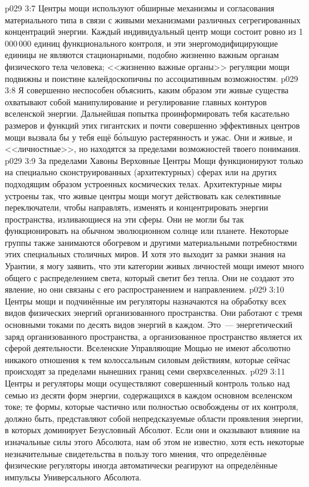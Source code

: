 \vs p029 3:7 Центры мощи используют обширные механизмы и согласования материального типа в связи с живыми механизмами различных сегрегированных концентраций энергии. Каждый индивидуальный центр мощи состоит ровно из 1\,000\,000 единиц функционального контроля, и эти энергомодифицирующие единицы не являются стационарными, подобно жизненно важным органам физического тела человека; <<жизненно важные органы>> регуляции мощи подвижны и поистине калейдоскопичны по ассоциативным возможностям.
\vs p029 3:8 Я совершенно неспособен объяснить, каким образом эти живые существа охватывают собой манипулирование и регулирование главных контуров вселенской энергии. Дальнейшая попытка проинформировать тебя касательно размеров и функций этих гигантских и почти совершенно эффективных центров мощи вызвала бы у тебя ещё б\'ольшую растерянность и ужас. Они и живые, и <<личностные>>, но находятся за пределами возможностей твоего понимания.
\vs p029 3:9 \pc За пределами Хавоны Верховные Центры Мощи функционируют только на специально сконструированных (архитектурных) сферах или на других подходящим образом устроенных космических телах. Архитектурные миры устроены так, что живые центры мощи могут действовать как селективные переключатели, чтобы направлять, изменять и концентрировать энергии пространства, изливающиеся на эти сферы. Они не могли бы так функционировать на обычном эволюционном солнце или планете. Некоторые группы также занимаются обогревом и другими материальными потребностями этих специальных столичных миров. И хотя это выходит за рамки знания на Урантии, я могу заявить, что эти категории живых личностей мощи имеют много общего с распределением света, который светит без тепла. Они не создают это явление, но они связаны с его распространением и направлением.
\vs p029 3:10 \pc Центры мощи и подчинённые им регуляторы назначаются на обработку всех видов физических энергий организованного пространства. Они работают с тремя основными токами по десять видов энергий в каждом. Это~--- энергетический заряд организованного пространства, а организованное пространство является их сферой деятельности. Вселенские Управляющие Мощью не имеют абсолютно никакого отношения к тем колоссальным силовым действиям, которые сейчас происходят за пределами нынешних границ семи сверхвселенных.
\vs p029 3:11 Центры и регуляторы мощи осуществляют совершенный контроль только над семью из десяти форм энергии, содержащихся в каждом основном вселенском токе; те формы, которые частично или полностью освобождены от их контроля, должно быть, представляют собой непредсказуемые области проявления энергии, в которых доминирует Безусловный Абсолют. Если они и оказывают влияние на изначальные силы этого Абсолюта, нам об этом не известно, хотя есть некоторые незначительные свидетельства в пользу того мнения, что определённые физические регуляторы иногда автоматически реагируют на определённые импульсы Универсального Абсолюта.

